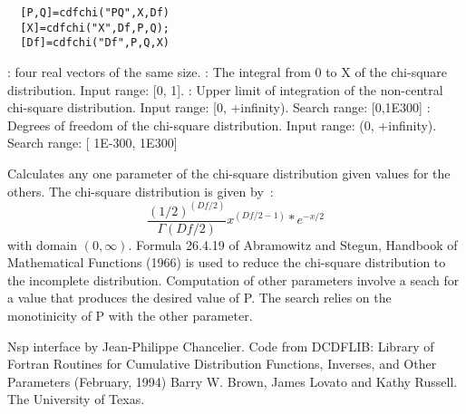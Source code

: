 \begin{mandesc}
\end{mandesc}
\label{cdfchi}
\begin{calling_sequence}
\begin{verbatim}
  [P,Q]=cdfchi("PQ",X,Df)  
  [X]=cdfchi("X",Df,P,Q);  
  [Df]=cdfchi("Df",P,Q,X)  
\end{verbatim}
\end{calling_sequence}
\begin{parameters}
  \begin{varlist}
     : four real vectors of the same size.
     :  The integral from 0 to X of the chi-square distribution. Input range: [0, 1].
     : Upper limit of integration of the non-central chi-square distribution. Input range: [0, +infinity). Search range: [0,1E300]
      : Degrees of freedom of the chi-square distribution. Input range: (0, +infinity). Search range: [ 1E-300, 1E300]
  \end{varlist}
\end{parameters}
\begin{mandescription}
  Calculates any one parameter of the chi-square 
  distribution given values for the others.
  The chi-square distribution is given by~:
  \begin{equation}
    \frac{(1/2)^{(Df/2)}}{\Gamma(Df/2)} x^{(Df/2 -1)} * e^{-x/2} 
  \end{equation}
  with domain $(0,\infty)$.
  Formula    26.4.19   of Abramowitz  and     Stegun, Handbook  of
  Mathematical Functions   (1966) is used   to reduce the chi-square
  distribution to the incomplete distribution.
  Computation of other parameters involve a seach for a value that
  produces  the desired  value  of P.   The search relies  on  the
  monotinicity of P with the other parameter.
\end{mandescription}

\begin{authors}
  Nsp interface by Jean-Philippe Chancelier. Code from DCDFLIB: 
  Library of Fortran Routines for Cumulative Distribution
  Functions, Inverses, and Other Parameters (February, 1994)
  Barry W. Brown, James Lovato and Kathy Russell. The University of Texas.
\end{authors}
